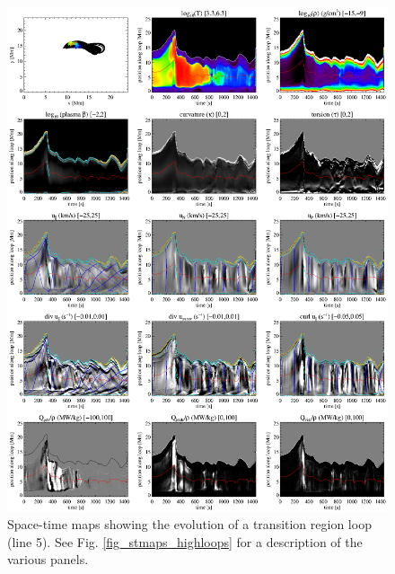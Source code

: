 \documentclass{aa}
\begin{document}
{\begin{figure}[!h]
\begin{center}
\includegraphics[width=\textwidth]{figures2/stmaps_line_005.eps}
\end{center}
\caption{Space-time maps showing the evolution of a transition region loop (line 5). See Fig. \ref{fig_stmaps_highloops} for a description of the various panels. \label{fig_stmaps_lowloops_005}}
\end{figure}


}
\end{document}
